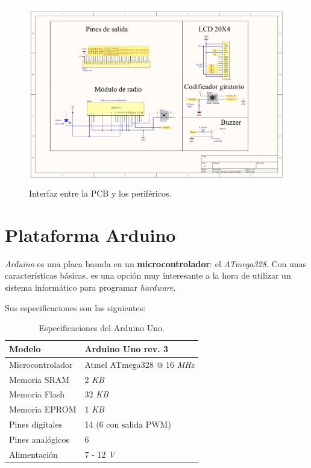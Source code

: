 \begin{figure}[H]
	\noindent \begin{centering}
		\includegraphics[width=\linewidth]{capitulo3/pcb_perifericos}
		\par\end{centering}
	\smallskip
	\caption{\label{fig:pcb_perifericos} Interfaz entre la PCB y los periféricos.}
\end{figure} 

\smallskip

\newpage

\section{Plataforma Arduino}

\textit{Arduino} es una placa basada en un \textbf{microcontrolador}: el \textit{ATmega328}. Con unas características básicas, es una opción muy interesante a la hora de utilizar un sistema informático para programar \textit{hardware}.

Sus especificaciones son las siguientes:

\smallskip

\begin{table}[H]
	\begin{center}
		\begin{tabular}{|l|l|}
			\hline Modelo & Arduino Uno rev. 3 \\
			\hline Microcontrolador & Atmel ATmega328 @ 16 \textit{MHz}\\
			\hline Memoria SRAM & 2 \textit{KB} \\		
			\hline Memoria Flash & 32 \textit{KB} \\
			\hline Memoria EPROM & 1 \textit{KB} \\
			\hline Pines digitales & 14 (6 con salida \acrshort{PWM}) \\
			\hline Pines analógicos & 6 \\
			\hline Alimentación & 7 - 12 \textit{V} \\
			\hline 
		\end{tabular}
		\smallskip
		\caption[Especificaciones del Arduino Uno]{\label{tab:arduino} Especificaciones del Arduino Uno. \cite{arduino}}	
	\end{center}
\end{table}

